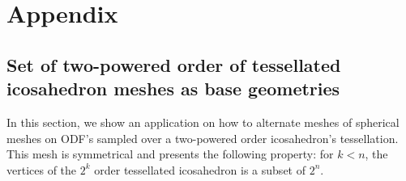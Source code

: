 \documentclass[twoside,twocolumn,10pt]{article}
\begin{document}

%
%
\section{Appendix}
\subsection{Set of two-powered order of tessellated icosahedron meshes as base geometries}
\label{ssec::ico_example}

In this section, we show an application on how to alternate meshes of spherical meshes on ODF's sampled over a two-powered order icosahedron's tessellation. This mesh is symmetrical and presents the following property: for $k < n$, the vertices of the $2^{k}$ order tessellated icosahedron is a subset of $2^{n}$.

\end{document}
